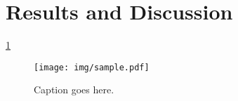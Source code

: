 \section{Results and Discussion}
\cref{fig:sample}

\begin{figure}
    \texttt{[image: img/sample.pdf]}
    \caption{Caption goes here.}
    \label{fig:sample}
\end{figure}
